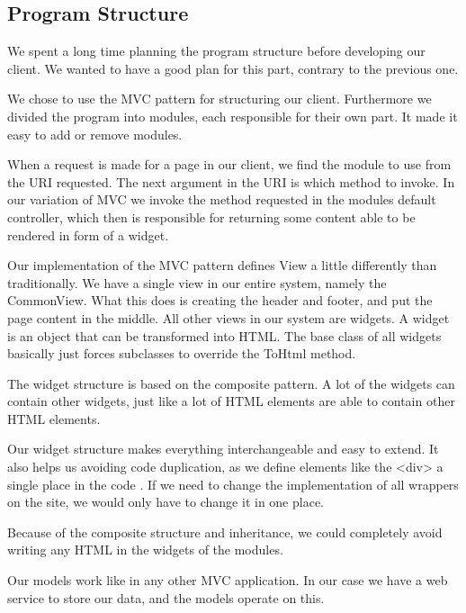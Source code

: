 \subsection{Program Structure}
We spent a long time planning the program structure before developing our client. We wanted to have a good plan for this part, contrary to the previous one.

We chose to use the MVC pattern for structuring our client.
Furthermore we divided the program into modules, each responsible for their own part. It made it easy to add or remove modules.

When a request is made for a page in our client, we find the module to use from the URI requested.
The next argument in the URI is which method to invoke. In our variation of MVC we invoke the method requested in the modules default controller, which then is responsible for returning some content able to be rendered in form of a widget.

Our implementation of the MVC pattern defines View a little differently than traditionally.
We have a single view in our entire system, namely the CommonView.
What this does is creating the header and footer, and put the page content in the middle.
All other views in our system are widgets. A widget is an object that can be transformed into HTML.
The base class of all widgets basically just forces subclasses to override the ToHtml method.

The widget structure is based on the composite pattern. A lot of the widgets can contain other widgets, just like a lot of HTML elements are able to contain other HTML elements.

Our widget structure makes everything interchangeable and easy to extend. It also helps us avoiding code duplication, as we define elements like the <div> a single place in the code . If we need to change the implementation of all wrappers on the site, we would only have to change it in one place.

Because of the composite structure and inheritance, we could completely avoid writing any HTML in the widgets of the modules.

Our models work like in any other MVC application. In our case we have a web service to store our data, and the models operate on this.
	\newpage